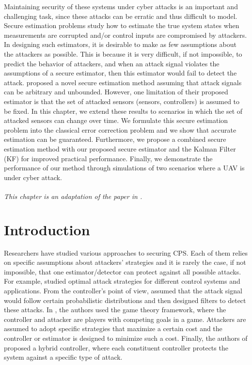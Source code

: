 \documentclass[../../thesis.tex]{subfiles}
\begin{document}
Maintaining security of these systems under cyber attacks is an important and challenging task, since these attacks can be erratic and thus difficult to model. Secure estimation problems study how to estimate the true system states when  measurements are corrupted and/or control inputs are compromised by attackers. 
In designing such estimators, it is desirable to make as few assumptions about the attackers as possible. This is because it is very difficult, if not impossible, to predict the behavior of attackers, and when an attack signal violates the assumptions of a secure estimator, then this estimator would fail to detect the attack.
\cite{Fawzi:2014} proposed a novel secure estimation method assuming that attack signals can be arbitrary and unbounded. However, one limitation of their proposed estimator is that the set of attacked sensors (sensors, controllers) is assumed to be fixed. 
In this chapter, we extend these results to scenarios in which the set of attacked sensors can change over time. We formulate this secure estimation problem into the classical error correction problem \cite{tao11} and we show that accurate estimation can be guaranteed. Furthermore, we propose a combined secure estimation method with our proposed secure estimator and the Kalman Filter (KF) for improved practical performance. Finally,  we demonstrate the performance of our method through simulations of two scenarios where a UAV is under cyber attack.
\\
\\
\noindent
\textit{This chapter is an adaptation of the paper in \cite{Hu:2016uav}.}

\section{Introduction}

Researchers have studied various approaches to securing CPS. Each of them relies on specific assumptions about attackers' strategies and it is rarely the case, if not impossible, that one estimator/detector can protect against all possible attacks. 
For example, \cite{Tong, KwonACC, liu2011false, teixeira2010cyber} studied optimal attack strategies for different control systems and applications. 
From the controller's point of view, \cite{Bullo, Liu} assumed that the attack signal would follow certain probabilistic distributions and then designed filters to detect these attacks.
In \cite{Wu, Basar, Basar2, Walrand, Pappas}, the authors used the game theory framework, where the controller and attacker are players with competing goals in a game. 
Attackers are assumed to adopt specific strategies that maximize a certain cost and the controller or estimator is designed to minimize such a cost.
Finally, the authors of \cite{KwonCDC} proposed a hybrid controller, where each constituent controller protects the system against a specific type of attack.
\end{document}
